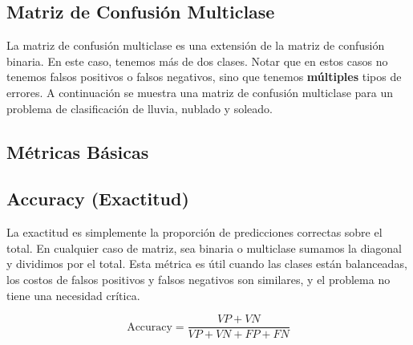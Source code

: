 \documentclass[12pt]{article}
\begin{document}
\subsection{Matriz de Confusión Multiclase}
La matriz de confusión multiclase es una extensión de la matriz de confusión binaria. En este caso, tenemos más de dos clases. Notar que en estos casos no tenemos falsos positivos o falsos negativos, sino que tenemos \textbf{múltiples} tipos de errores. A continuación se muestra una matriz de confusión multiclase para un problema de clasificación de lluvia, nublado y soleado.

\begin{center}
\end{center}
\subsection{Métricas Básicas}

\subsection{Accuracy (Exactitud)}
La exactitud es simplemente la proporción de predicciones correctas sobre el total. En cualquier caso de matriz, sea binaria o multiclase sumamos la diagonal y dividimos por el total. Esta métrica es útil cuando las clases están balanceadas, los costos de falsos positivos y falsos negativos son similares, y el problema no tiene una necesidad crítica.

\vspace{0.3em}

\[
\text{Accuracy} = \frac{VP + VN}{VP + VN + FP + FN}
\]
\end{document}
